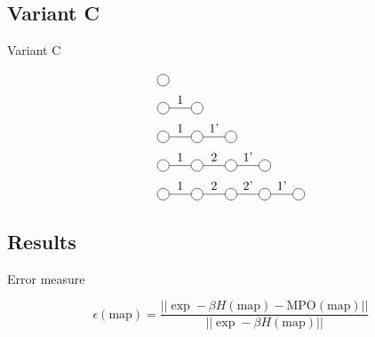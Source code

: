\documentclass[aspectratio=169]{beamer}
\begin{document}

\subsection{Variant C}
\begin{frame}{Variant C}

    \begin{equation}
        \begin{split}
            &\mpob{1}{ {,}  }{}{}{}{{,,}} \\
            &\mpob{2}{ {,"1",}  }{}{}{}{{,,}}\\
            &\mpob{3}{ {,"1","1'",}  }{}{}{}{{,,,}}\\
            &\mpob{4}{ {,"1","2","1'",}  }{}{}{}{{,,,,,}}\\
            &\mpob{5}{ {,"1","2","2'","1'",}  }{}{}{}{{,,,,,}}\\
        \end{split}
    \end{equation}

\end{frame}


\subsection{Results}
\begin{frame}{Error measure}


    \begin{equation}
        \epsilon(\text{map}) = \frac{|| \exp -\beta H( \text{map} ) - \text{MPO}(\text{map}) || }{|| \exp -\beta H(\text{map}) || }
    \end{equation}

\end{frame}
\end{document}
